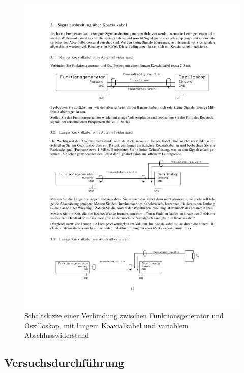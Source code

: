 \documentclass[12pt,a4paper]{article}
\begin{document}
\begin{figure}[H] 
  \centering
    \includegraphics[trim = 10mm 25mm 10mm 235mm, clip, scale = 1]{3-3_3+1.pdf}
  	\caption[Schaltskizze einer Verbindung zwischen Funktionsgenerator und Oszilloskop, mit langem Koaxialkabel und variablem Abschlusswiderstand]{Schaltskizze einer Verbindung zwischen Funktionsgenerator und Oszilloskop, mit langem Koaxialkabel und variablem Abschlusswiderstand\footnotemark}
  \label{fig:3.5}
\end{figure}

\subsection{Versuchsdurchführung}
\end{document}
